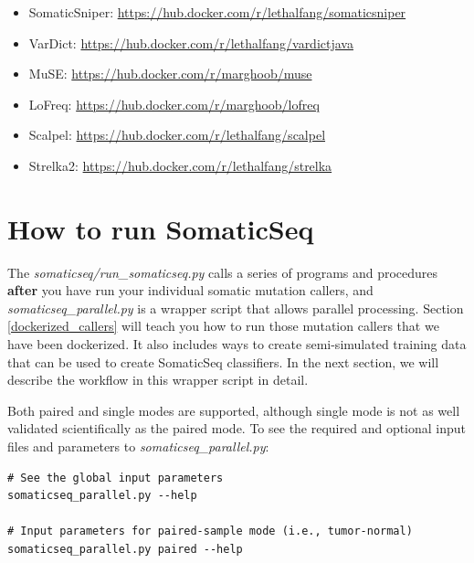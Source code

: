 \documentclass[10pt,letterpaper]{article}
\begin{document}
\begin{sloppypar}
\begin{itemize}
  \item SomaticSniper: \href{https://hub.docker.com/r/lethalfang/somaticsniper}{https://hub.docker.com/r/lethalfang/somaticsniper}

  \item VarDict:       \href{https://hub.docker.com/r/lethalfang/vardictjava}{https://hub.docker.com/r/lethalfang/vardictjava}

  \item MuSE:          \href{https://hub.docker.com/r/marghoob/muse}{https://hub.docker.com/r/marghoob/muse}

  \item LoFreq:        \href{https://hub.docker.com/r/marghoob/lofreq}{https://hub.docker.com/r/marghoob/lofreq}

  \item Scalpel:       \href{https://hub.docker.com/r/lethalfang/scalpel}{https://hub.docker.com/r/lethalfang/scalpel}

  \item Strelka2:      \href{https://hub.docker.com/r/lethalfang/strelka}{https://hub.docker.com/r/lethalfang/strelka}

\end{itemize}


\section{How to run SomaticSeq} \label{Wrapper_script}

The \textit{somaticseq/run\_somaticseq.py} calls a series of programs and procedures \textbf{after} you have run your individual somatic mutation callers, and \textit{somaticseq\_parallel.py} is a wrapper script that allows parallel processing. Section \ref{dockerized_callers} will teach you how to run those mutation callers that we have been dockerized. It also includes ways to create semi-simulated training data that can be used to create SomaticSeq classifiers. In the next section, we will describe the workflow in this wrapper script in detail. 

Both paired and single modes are supported, although single mode is not as well validated scientifically as the paired mode. To see the required and optional input files and parameters to \textit{somaticseq\_parallel.py}:

\begin{lstlisting}
# See the global input parameters
somaticseq_parallel.py --help

# Input parameters for paired-sample mode (i.e., tumor-normal)
somaticseq_parallel.py paired --help


\end{lstlisting}
\end{sloppypar}
\end{document}
